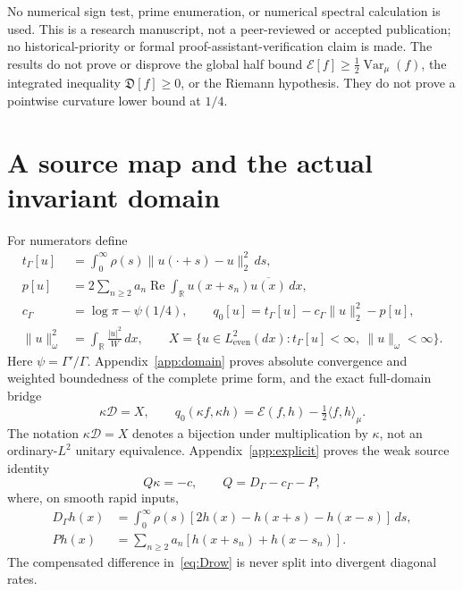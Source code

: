 \documentclass[11pt,a4paper]{article}
\numberwithin{equation}{section}
\theoremstyle{definition}
\theoremstyle{remark}
\newcommand{\R}{\mathbb R}
\newcommand{\E}{\mathcal E}
\newcommand{\D}{\mathcal D}
\newcommand{\Le}{L^2_{\mathrm{even}}(dx)}
\newcommand{\tg}{t_{\Gamma}}
\newcommand{\cg}{c_{\Gamma}}
\newcommand{\Var}{\operatorname{Var}}
\newcommand{\ip}[2]{\langle #1,#2\rangle}
\newcommand{\norm}[1]{\lVert #1\rVert}
\newcommand{\Def}{\mathfrak D}
\begin{document}
No numerical sign test, prime enumeration, or numerical spectral calculation is used. This is a research manuscript, not a peer-reviewed or accepted publication; no historical-priority or formal proof-assistant-verification claim is made. The results do not prove or disprove the global half bound $\E[f]\ge\tfrac12\Var_\mu(f)$, the integrated inequality $\Def[f]\ge0$, or the Riemann hypothesis. They do not prove a pointwise curvature lower bound at $1/4$.

\section{A source map and the actual invariant domain}\label{sec:source}

For numerators define
\begin{align}
 \tg[u]&=\int_0^\infty\rho(s)\norm{u(\cdot+s)-u}_2^2\,ds,\label{eq:physicalgamma}\\
 p[u]&=2\sum_{n\ge2}a_n\operatorname{Re}\int_\R u(x+s_n)\overline{u(x)}\,dx,\label{eq:physicalprime}\\
 \cg&=\log\pi-\psi(1/4),\qquad
 q_0[u]=\tg[u]-\cg\norm{u}_2^2-p[u],\label{eq:qzero}\\
 \norm{u}_\omega^2&=\int_\R\frac{|u|^2}{W}\,dx,\qquad
 X=\{u\in\Le:\tg[u]<\infty,\ \norm{u}_\omega<\infty\}.\label{eq:X}
\end{align}
Here $\psi=\Gamma'/\Gamma$. Appendix~\ref{app:domain} proves absolute convergence and weighted boundedness of the complete prime form, and the exact full-domain bridge
\begin{equation}\label{eq:fullbridge-main}
 \kappa\D=X,\qquad
 q_0(\kappa f,\kappa h)=\E(f,h)-\tfrac12\ip{f}{h}_\mu.
\end{equation}
The notation $\kappa\D=X$ denotes a bijection under multiplication by $\kappa$, not an ordinary-$L^2$ unitary equivalence. Appendix~\ref{app:explicit} proves the weak source identity
\begin{equation}\label{eq:source-main}
 Q\kappa=-c,\qquad Q=D_\Gamma-\cg-P,
\end{equation}
where, on smooth rapid inputs,
\begin{align}
 D_\Gamma h(x)&=\int_0^\infty\rho(s)
       [2h(x)-h(x+s)-h(x-s)]\,ds,\label{eq:Drow}\\
 Ph(x)&=\sum_{n\ge2}a_n[h(x+s_n)+h(x-s_n)].\label{eq:Prow}
\end{align}
The compensated difference in~\eqref{eq:Drow} is never split into divergent diagonal rates.
\end{document}
